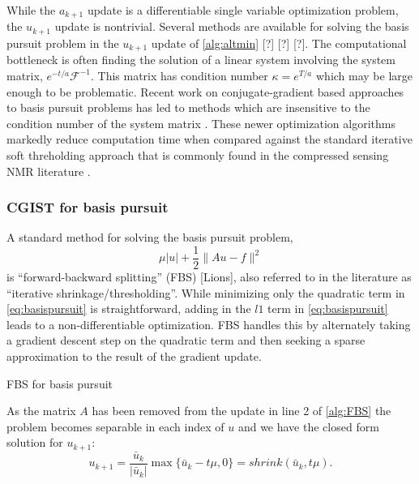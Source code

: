 \documentclass[11pt]{article}
\begin{document}
While the $a_{k+1}$ update is a differentiable single variable optimization problem, the $u_{k+1}$ update is nontrivial. Several methods are available for solving the basis pursuit problem in the $u_{k+1}$ update of \cref{alg:altmin} [?] [?] [?]. The computational bottleneck is often finding the solution of a linear system involving the system matrix, $e^{-t/a}\mathcal{F}^{-1}$. This matrix has condition number $\kappa = e^{T/a}$ which may be large enough to be problematic. Recent work on conjugate-gradient based approaches to basis pursuit problems has led to methods which are insensitive to the condition number of the system matrix \cite{Goldsteina}. These newer optimization algorithms markedly reduce computation time when compared against the standard iterative soft threholding approach that is commonly found in the compressed sensing NMR literature \cite{Goldsteina}.

\subsubsection{CGIST for basis pursuit}

A standard method for solving the basis pursuit problem,
\begin{equation}\label{eq:basispursuit}
\mu |u| + \frac{1}{2}\|Au-f\|^2
\end{equation}
is ``forward-backward splitting'' (FBS) [Lions], also referred to in the literature as ``iterative shrinkage/thresholding''. While minimizing only the quadratic term in \cref{eq:basispursuit} is straightforward, adding in the $l1$ term in \cref{eq:basispursuit} leads to a non-differentiable optimization. FBS handles this by alternately taking a gradient descent step on the quadratic term and then seeking a sparse approximation to the result of the gradient update.
\begin{algorithm}[h!]
\caption{FBS for basis pursuit}
\label{alg:FBS}
\end{algorithm}

As the matrix $A$ has been removed from the update in line 2 of \cref{alg:FBS} the problem becomes separable in each index of $u$ and we have the closed form solution for $u_{k+1}$:
\begin{equation}\label{eq:shrinkdef}
u_{k+1} = \frac{\bar{u}_k}{|\bar{u}_k|}\max\{\bar{u}_k-t\mu,0\} = shrink(\bar{u}_k,t\mu).
\end{equation}
\end{document}
